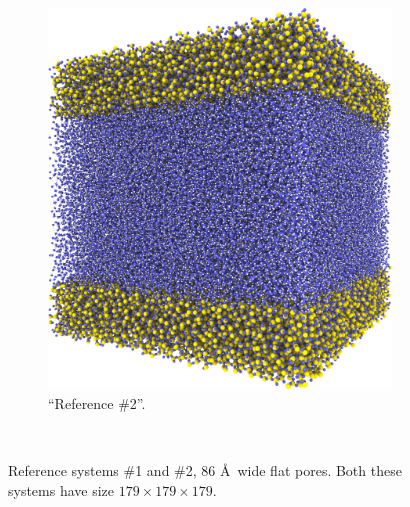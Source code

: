 \begin{figure}[htpb]
{\begin{subfigure}[t]{\myfigwidth}
            \includegraphics[width=\textwidth]{images/systems/trimmed-flat_square_fracture03_04}%
            \caption{``Reference \#2''.}%
            \label{fig:renderings_flat_square_fracture03}%
        \end{subfigure}%
    }%
    \vspace{10pt}\\%
    \caption{%
        Reference systems \#1 and \#2, 86 \AA\ wide flat pores. Both these systems have size $179 \times 179 \times 179$.%
        \label{fig:renderings_flat_fractures01}%
    }%
\end{figure}%


